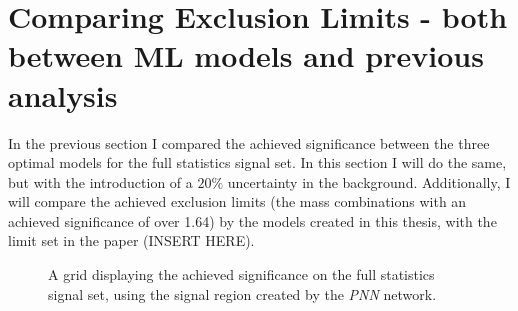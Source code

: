 \section{Comparing Exclusion Limits - both between ML models and previous analysis}
In the previous section I compared the achieved significance between 
the three optimal models for the full statistics signal set. In this section 
I will do the same, but with the introduction of a $20\%$ uncertainty in the background.
Additionally, I will compare the achieved exclusion limits (the mass combinations with an achieved 
significance of over 1.64) by the models created in this thesis, with the limit set in the paper (INSERT 
HERE).

\begin{figure}
    \caption{A grid displaying the achieved significance on the full statistics signal set, using the signal region 
    created by the \emph{PNN} network.}
    \label{fig:compLimit}
\end{figure}